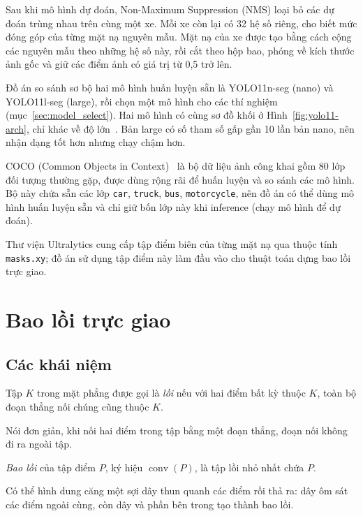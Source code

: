 Sau khi mô hình dự đoán, Non-Maximum Suppression (NMS) loại bỏ các dự đoán trùng nhau trên cùng một xe.
Mỗi xe còn lại có 32 hệ số riêng, cho biết mức đóng góp của từng mặt nạ nguyên mẫu. Mặt nạ của xe được tạo bằng cách cộng các nguyên mẫu theo những hệ số này, rồi cắt theo hộp bao, phóng về kích thước ảnh gốc và giữ các điểm ảnh có giá trị từ 0,5 trở lên.

Đồ án so sánh sơ bộ hai mô hình huấn luyện sẵn là YOLO11n-seg (nano) và YOLO11l-seg (large), rồi chọn một mô hình cho các thí nghiệm (mục~\ref{sec:model_select}). Hai mô hình có cùng sơ đồ khối ở Hình~\ref{fig:yolo11-arch}, chỉ khác về độ lớn~\cite{yolo11}.
Bản large có số tham số gấp gần 10 lần bản nano, nên nhận dạng tốt hơn nhưng chạy chậm hơn.

COCO (Common Objects in Context)~\cite{lin2014coco} là bộ dữ liệu ảnh công khai gồm 80 lớp đối tượng thường gặp, được dùng rộng rãi để huấn luyện và so sánh các mô hình. Bộ này chứa sẵn các lớp \texttt{car}, \texttt{truck}, \texttt{bus}, \texttt{motorcycle}, nên đồ án có thể dùng mô hình huấn luyện sẵn và chỉ giữ bốn lớp này khi inference (chạy mô hình để dự đoán).

Thư viện Ultralytics cung cấp tập điểm biên của từng mặt nạ qua thuộc tính \texttt{masks.xy}; đồ án sử dụng tập điểm này làm đầu vào cho thuật toán dựng bao lồi trực giao.

\section{Bao lồi trực giao}
\label{sec:och}

\subsection{Các khái niệm}

\begin{dinhnghia}
Tập $K$ trong mặt phẳng được gọi là \emph{lồi} nếu với hai điểm bất kỳ thuộc $K$, toàn bộ đoạn thẳng nối chúng cũng thuộc $K$.
\end{dinhnghia}
Nói đơn giản, khi nối hai điểm trong tập bằng một đoạn thẳng, đoạn nối không đi ra ngoài tập.

\begin{dinhnghia}
\emph{Bao lồi} của tập điểm $P$, ký hiệu $\operatorname{conv}(P)$, là tập lồi nhỏ nhất chứa $P$.
\end{dinhnghia}
Có thể hình dung căng một sợi dây thun quanh các điểm rồi thả ra: dây ôm sát các điểm ngoài cùng, còn dây và phần bên trong tạo thành bao lồi.


